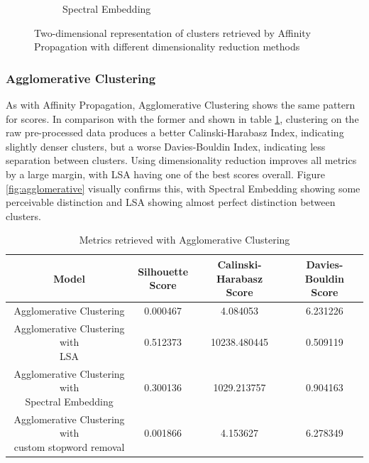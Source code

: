 \begin{figure}
\begin{subfigure}{.3\textwidth}
    \caption{Spectral Embedding}
    \label{fig:affinity_propagation_spectral}
  \end{subfigure}
  \caption{Two-dimensional representation of clusters retrieved by Affinity Propagation with different dimensionality reduction methods}
  \label{fig:affinity_propagation}
\end{figure}

\subsubsection{Agglomerative Clustering}

As with Affinity Propagation, Agglomerative Clustering shows the same pattern for scores. In comparison with the former and shown in table \ref{tab:scores_agglomerative}, clustering on the raw pre-processed data produces a better Calinski-Harabasz Index, indicating slightly denser clusters, but a worse Davies-Bouldin Index, indicating less separation between clusters.
Using dimensionality reduction improves all metrics by a large margin, with LSA having one of the best scores overall. Figure \ref{fig:agglomerative} visually confirms this, with Spectral Embedding showing some perceivable distinction and LSA showing almost perfect distinction between clusters.

\begin{table}[]
  \centering
  \begin{tabular}{c|c|c|c}
    Model &  \shortstack[c]{Silhouette \\ Score} & \shortstack[c]{Calinski-Harabasz \\ Score} &  \shortstack[c]{Davies-Bouldin \\ Score}  \\
    \hline
    \hline
    Agglomerative Clustering & 0.000467 & 4.084053 & 6.231226 \\
    \hline
    \shortstack[c]{Agglomerative Clustering with \\ LSA} & 0.512373 & 10238.480445 & 0.509119 \\
    \hline
    \shortstack[c]{Agglomerative Clustering with \\ Spectral Embedding} & 0.300136 & 1029.213757 & 0.904163 \\
    \hline
    \shortstack[c]{Agglomerative Clustering with \\ custom stopword removal} & 0.001866 & 4.153627 & 6.278349 \\
   \end{tabular}
  \caption{Metrics retrieved with Agglomerative Clustering}
  \label{tab:scores_agglomerative}
\end{table}

